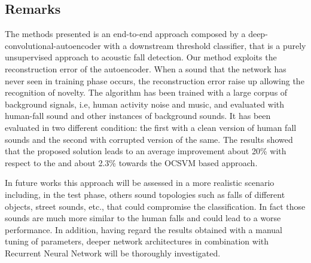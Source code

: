 \subsection{Remarks}
The methods presented is an end-to-end approach composed by a deep-convolutional-autoencoder with a downstream threshold classifier, that is a purely unsupervised approach to acoustic fall detection.
Our method exploits the reconstruction error of the autoencoder. When a sound that the network has never seen in training phase occurs, the reconstruction error raise up allowing the recognition of novelty.
The algorithm has been trained with a large corpus of background signals, i.e, human activity noise and music, and evaluated with human-fall sound and other instances of background sounds. It has been evaluated in two different condition: the first with a clean version of human fall sounds and the second with corrupted version of the same.
The results showed that the proposed solution leads to an average improvement about 20\%  with respect to the \cite{Popescu2009} and about 2.3\% towards the OCSVM based approach.

In future works this approach will be assessed in a more realistic scenario including, in the test phase, others sound topologies such as falls of different objects, street sounds, etc., that could compromise the classification. In fact those sounds are much more similar to the human falls and could lead to a worse performance. In addition, having regard the results obtained with a manual tuning of parameters, deeper network architectures in combination with Recurrent Neural Network will be thoroughly investigated.

